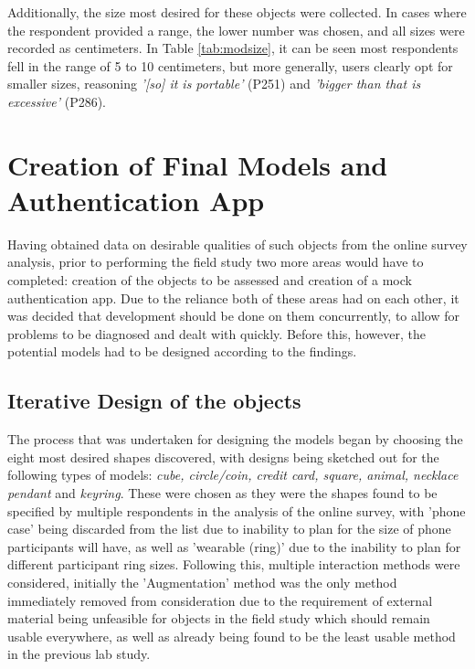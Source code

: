 \documentclass{l4proj}
\begin{document}
Additionally, the size most desired for these objects were collected. In cases where the respondent provided a range, the lower number was chosen, and all sizes were recorded as centimeters. In Table \ref{tab:modsize}, it can be seen most respondents fell in the range of 5 to 10 centimeters, but more generally, users clearly opt for smaller sizes, reasoning \textit{'[so] it is portable'} (P251) and \textit{'bigger than that is excessive'} (P286).

\section{Creation of Final Models and Authentication App}

Having obtained data on desirable qualities of such objects from the online survey analysis, prior to performing the field study two more areas would have to completed: creation of the objects to be assessed and creation of a mock authentication app. Due to the reliance both of these areas had on each other, it was decided that development should be done on them concurrently, to allow for problems to be diagnosed and dealt with quickly. Before this, however, the potential models had to be designed according to the findings.

\subsection{Iterative Design of the objects}

The process that was undertaken for designing the models began by choosing the eight most desired shapes discovered, with designs being sketched out for the following types of models: \textit{cube, circle/coin, credit card, square, animal, necklace pendant} and \textit{keyring}. These were chosen as they were the shapes found to be specified by multiple respondents in the analysis of the online survey, with 'phone case' being discarded from the list due to inability to plan for the size of phone participants will have, as well as 'wearable (ring)' due to the inability to plan for different participant ring sizes. Following this, multiple interaction methods were considered, initially the 'Augmentation' method was the only method immediately removed from consideration due to the requirement of external material being unfeasible for objects in the field study which should remain usable everywhere, as well as already being found to be the least usable method in the previous lab study.
\end{document}
